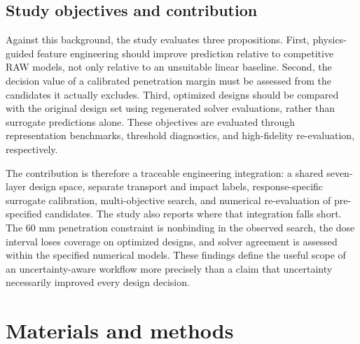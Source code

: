 \documentclass[12pt]{elsarticle}
\begin{document}
\subsection{Study objectives and contribution}
Against this background, the study evaluates three propositions. First, physics-guided feature engineering should improve prediction relative to competitive RAW models, not only relative to an unsuitable linear baseline. Second, the decision value of a calibrated penetration margin must be assessed from the candidates it actually excludes. Third, optimized designs should be compared with the original design set using regenerated solver evaluations, rather than surrogate predictions alone. These objectives are evaluated through representation benchmarks, threshold diagnostics, and high-fidelity re-evaluation, respectively.

The contribution is therefore a traceable engineering integration: a shared seven-layer design space, separate transport and impact labels, response-specific surrogate calibration, multi-objective search, and numerical re-evaluation of pre-specified candidates. The study also reports where that integration falls short. The 60 mm penetration constraint is nonbinding in the observed search, the dose interval loses coverage on optimized designs, and solver agreement is assessed within the specified numerical models. These findings define the useful scope of an uncertainty-aware workflow more precisely than a claim that uncertainty necessarily improved every design decision.

\section{Materials and methods}
\end{document}
